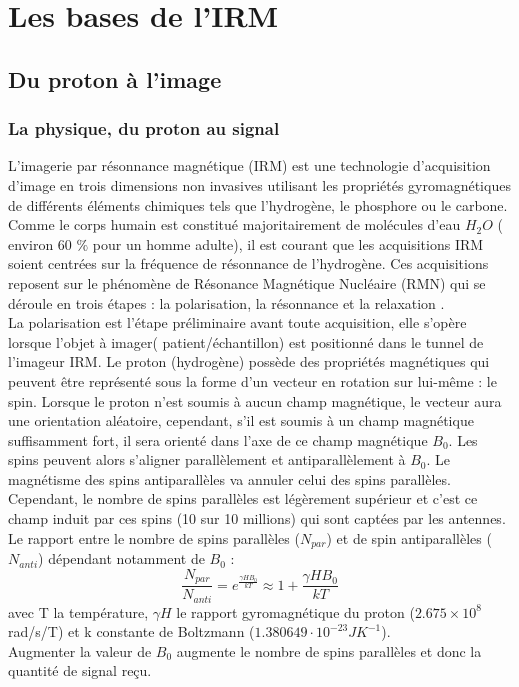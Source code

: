 \section{Les bases de l'IRM}
\subsection{Du proton à l’image}
\subsubsection{La physique, du proton au signal}

L’imagerie par résonnance magnétique (IRM) est une technologie d’acquisition d’image en trois dimensions non invasives
 utilisant les propriétés gyromagnétiques de différents éléments chimiques tels que l’hydrogène, le phosphore ou le carbone.
  Comme le corps humain est constitué majoritairement de molécules d’eau $H_2O$ ( environ 60 $\%$ pour un homme adulte), 
  il est courant que les acquisitions IRM soient centrées sur la fréquence de résonnance de l’hydrogène. 
  Ces acquisitions reposent sur le phénomène de Résonance Magnétique Nucléaire (RMN) qui se déroule en trois étapes : 
  la polarisation, la résonnance et la relaxation \cite{HolgerFrsterling2009}.
\\
La polarisation est l’étape préliminaire avant toute acquisition, elle s’opère lorsque l’objet à imager( patient/échantillon) 
est positionné dans le tunnel de l’imageur IRM. Le proton (hydrogène) 
possède des propriétés magnétiques qui peuvent être représenté sous la forme d’un vecteur en rotation sur lui-même : 
le spin. Lorsque le proton n’est soumis à aucun champ magnétique, le vecteur aura une orientation aléatoire, cependant, s’il est soumis à un champ magnétique suffisamment fort, il sera orienté dans l’axe de ce champ magnétique $B_0$. Les spins peuvent alors s’aligner parallèlement et antiparallèlement à $B_0$. Le magnétisme des spins antiparallèles va annuler celui des spins parallèles. Cependant, le nombre de spins parallèles est légèrement supérieur et c'est ce champ induit par ces spins (10 sur 10 millions) qui sont captées par les antennes. Le rapport entre le nombre de spins parallèles ($N_{par}$) et de spin antiparallèles ($N_{anti}$) dépendant notamment de $B_0$ : 
\begin{equation}
\nonumber
	\frac{N_{par}}{N_{anti}} = e^{\frac{\gamma H B_0}{kT}} \approx 1 + \frac{\gamma H B_0}{kT}
\end{equation}
avec T la température, $\gamma H$ le rapport gyromagnétique du proton ($2.675×10^8$ rad/s/T) et k constante de Boltzmann ($1.380649 \cdot 10^{-23} J K^{-1}$).
\\
Augmenter la valeur de $B_0$ augmente le nombre de spins parallèles et donc la quantité de signal reçu.

